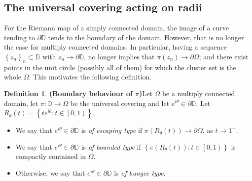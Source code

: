 \documentclass[11pt,a4paper,reqno]{amsart}
\theoremstyle{plain}
\theoremstyle{definition}
\newtheorem{defi}[thm]{Definition}
\theoremstyle{plain}
\def\DD{\mathbb{D}}
\begin{document}
\subsection{The universal covering acting on radii}
For the Riemann map of a simply connected domain, the image of a curve tending to $\partial\DD$ tends to the boundary of the domain. However, that is no longer the case for multiply connected domains. In particular, having a sequence $ \left\lbrace z_n \right\rbrace _n\subset\mathbb{D}$ with $ z_n\to\partial\mathbb{D} $, no longer implies that $ \pi(z_n)\to\partial\Omega $; and there exist points in the unit circle (possibly all of them) for which the cluster set is the whole $ \overline{\Omega} $. This motivates the following definition. %
\begin{defi}{\bf (Boundary behaviour of $ \pi $)}\label{def:escaping-bounded-bungee}
	Let $ \Omega $ be a multiply connected domain,  let $ \pi\colon\mathbb{D}\to \Omega $ be the universal covering and let $ e^{i\theta}\in\partial\mathbb{D} $. Let $ R_\theta(t)=\left\lbrace te^{i\theta} \colon t\in \left[ 0,1\right)  \right\rbrace $.
	\begin{itemize}
		\item  We say that $ e^{i\theta}\in\partial \mathbb{D} $ is {\em of escaping type} if $ \pi(R_\theta (t))\to\partial \Omega $, as $ t\to 1^{-} $.
		\item We say that $ e^{i\theta}\in\partial \mathbb{D} $ is {\em of bounded type} if $\left\lbrace  \pi(R_\theta (t))\colon t\in \left[ 0,1\right) \right\rbrace  $ is compactly contained in $ \Omega $.
		\item Otherwise, we say that $ e^{i\theta}\in\partial \mathbb{D} $ is {\em of bungee type}.
	\end{itemize}
\end{defi}
\end{document}

